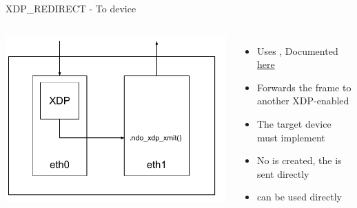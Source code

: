 \begin{frame}{XDP\_REDIRECT - To device}
	\begin{columns}
		\includegraphics[width=\textwidth]{slides/networking-ebpf-xdp/xdp_redirect_devmap.pdf}
	\begin{itemize}
		\item Uses , Documented \href{https://docs.kernel.org/bpf/map_devmap.html}{here}
		\item Forwards the frame to another XDP-enabled 
		\item The target device must implement 
		\item No  is created, the  is sent directly
		\item {} can be used directly
	\end{itemize}
	\end{columns}
\end{frame}

